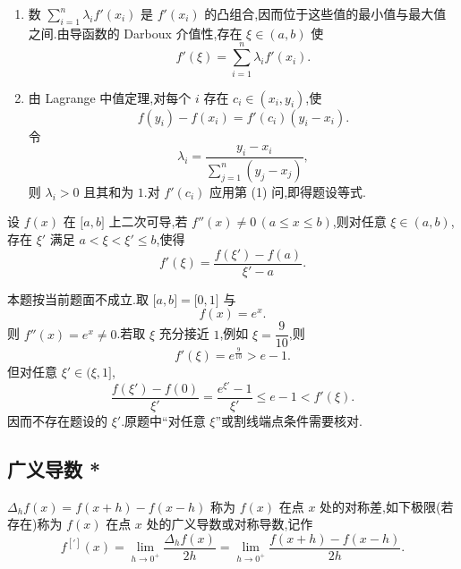 \begin{solution}
    \leavevmode
    \begin{enumerate}
        \item 数 $\displaystyle\sum\limits_{i=1}^{n}\lambda_i f'(x_i)$ 是 $f'(x_i)$ 的凸组合,因而位于这些值的最小值与最大值之间.由导函数的 Darboux 介值性,存在 $\xi\in(a,b)$ 使
              \[
                  f'(\xi)=\sum\limits_{i=1}^{n}\lambda_i f'(x_i).
              \]
        \item 由 Lagrange 中值定理,对每个 $i$ 存在 $c_i\in(x_i,y_i)$,使
              \[
                  f(y_i)-f(x_i)=f'(c_i)(y_i-x_i).
              \]
              令
              \[
                  \lambda_i=\dfrac{y_i-x_i}{\displaystyle\sum\limits_{j=1}^{n}(y_j-x_j)},
              \]
              则 $\lambda_i>0$ 且其和为 $1$.对 $f'(c_i)$ 应用第 (1) 问,即得题设等式.
    \end{enumerate}
\end{solution}

\begin{example}
    设 $f(x)$ 在 $\lbrack a,b\rbrack$ 上二次可导,若 $f''(x)\neq0\,(a\leq x\leq b)$,则对任意 $\xi\in(a,b)$,存在 $\xi'$ 满足 $a<\xi<\xi'\leq b$,使得
    \[
        f'(\xi)=\dfrac{f(\xi')-f(a)}{\xi'-a}.
    \]
\end{example}
\exampleblank

\begin{solution}
    本题按当前题面不成立.取 $\lbrack a,b\rbrack=\lbrack0,1\rbrack$ 与
    \[
        f(x)=e^x.
    \]
    则 $f''(x)=e^x\neq0$.若取 $\xi$ 充分接近 $1$,例如 $\xi=\dfrac{9}{10}$,则
    \[
        f'(\xi)=e^{\frac{9}{10}}>e-1.
    \]
    但对任意 $\xi'\in(\xi,1\rbrack$,
    \[
        \dfrac{f(\xi')-f(0)}{\xi'}
        =\dfrac{e^{\xi'}-1}{\xi'}
        \leq e-1<f'(\xi).
    \]
    因而不存在题设的 $\xi'$.原题中``对任意 $\xi$''或割线端点条件需要核对.
\end{solution}



\subsection{广义导数 *}

\begin{definition}
    $\Delta_hf(x)=f(x+h)-f(x-h)$ 称为 $f(x)$ 在点 $x$ 处的对称差,如下极限(若存在)称为 $f(x)$ 在点 $x$ 处的广义导数或对称导数,记作
    \[
        f^{[\prime]}(x)
        =\lim\limits_{h\to0^+}\dfrac{\Delta_hf(x)}{2h}
        =\lim\limits_{h\to0^+}\dfrac{f(x+h)-f(x-h)}{2h}.
    \]
\end{definition}

